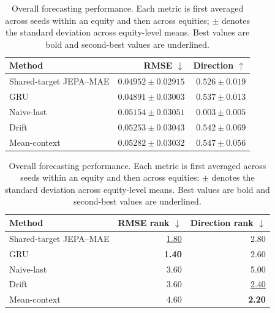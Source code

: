 \begin{table}[t]
\centering
\small
\caption{Overall forecasting performance. Each metric is first averaged across seeds within an equity and then across equities; $\pm$ denotes the standard deviation across equity-level means. Best values are bold and second-best values are underlined.}
\label{tab:main_metrics}
\begin{tabular}{lrr}
\toprule
Method & RMSE $\downarrow$ & Direction $\uparrow$ \\
\midrule
Shared-target JEPA--MAE & \underline{$0.04952 \pm 0.02915$} & $0.526 \pm 0.019$ \\
GRU & \textbf{$0.04891 \pm 0.03003$} & $0.537 \pm 0.013$ \\
Naive-last & $0.05154 \pm 0.03051$ & $0.003 \pm 0.005$ \\
Drift & $0.05253 \pm 0.03043$ & \underline{$0.542 \pm 0.069$} \\
Mean-context & $0.05282 \pm 0.03032$ & \textbf{$0.547 \pm 0.056$} \\
\bottomrule
\end{tabular}
\par\medskip
\begin{tabular}{lrr}
\toprule
Method & RMSE rank $\downarrow$ & Direction rank $\downarrow$ \\
\midrule
Shared-target JEPA--MAE & \underline{1.80} & 2.80 \\
GRU & \textbf{1.40} & 2.60 \\
Naive-last & 3.60 & 5.00 \\
Drift & 3.60 & \underline{2.40} \\
Mean-context & 4.60 & \textbf{2.20} \\
\bottomrule
\end{tabular}
\end{table}
